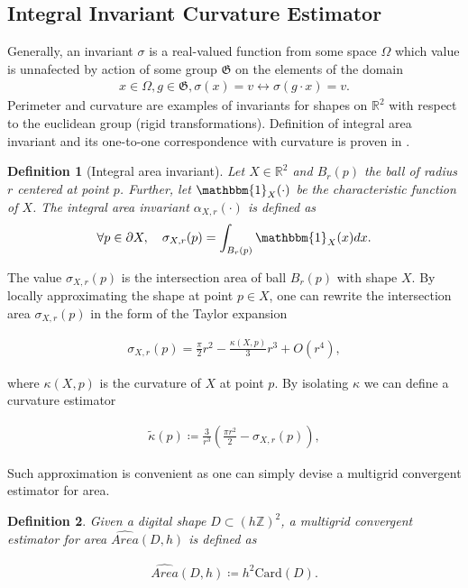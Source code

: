 \documentclass[runningheads]{llncs}
\newtheorem{ddef}{Definition}
\begin{document}
\subsection{Integral Invariant Curvature Estimator}
Generally, an invariant $\sigma$ is a real-valued function from some space $\Omega$ which value is unnafected by action of some group $\mathfrak{G}$ on the elements of the domain
\begin{align*}
  x \in \Omega, g \in \mathfrak{G}, \sigma(x) = v \longleftrightarrow \sigma(g \cdot x ) = v.
\end{align*}
Perimeter and curvature are examples of invariants for shapes on $\mathbb{R}^2$ with respect to the euclidean group (rigid transformations). Definition of integral area invariant and its one-to-one correspondence with curvature is proven in \cite{manay04}.


\begin{ddef}[Integral area invariant]
  Let $X \in \mathbb{R}^2$ and $B_r(p)$ the ball of radius $r$ centered at point $p$. Further, let $\mathbbm{1}_X(\cdot)$ be the characteristic function of $X$. The integral area invariant $\alpha_{X,r}(\cdot)$ is defined as
  \begin{align*}
    \forall p \in \partial X, \quad \sigma_{X,r}(p) = \int_{B_r(p)}{ \mathbbm{1}_X(x) dx}.
  \end{align*}
\end{ddef}


The value $\sigma_{X,r}(p)$ is the intersection area of ball $B_r(p)$ with shape $X$. By locally approximating the shape at point $p \in X$, one can rewrite the intersection area $\sigma_{X,r}(p)$ in the form of the Taylor expansion \cite{pottman09}
	
\begin{align*}
  \sigma_{X,r}(p) = \frac{\pi}{2}r^2 - \frac{\kappa(X,p)}{3}r^3 + O(r^4),
\end{align*}
		
where $\kappa(X,p)$ is the curvature of $X$ at point $p$. By isolating $\kappa$ we can define a curvature estimator
	
\begin{align}
  \tilde{\kappa}(p) \coloneqq \frac{3}{r^3}\left( \frac{\pi r^2}{2} - \sigma_{X,r}(p) \right),
  \label{eq:curvature_approximation}
\end{align}
	
Such approximation is convenient as one can simply devise a multigrid convergent estimator for area.

\begin{ddef}	
  Given a digital shape $D \subset (h \mathbb{Z})^2$, a multigrid convergent estimator for area $\widehat{Area}(D,h)$ is defined as	
		
  \begin{align}
    \widehat{Area}(D,h) \coloneqq h^2\text{Card}\left( D \right).	
    \label{eq:digital_estimator_area}
  \end{align}
\end{ddef}
	
\end{document}
